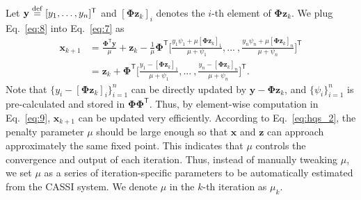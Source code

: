 \documentclass{article}
\newcommand{\tsp}{^{\mathsf{T}}}
\begin{document}
Let $\mathbf{y} \stackrel{\rm def}{=} [y_1,\dots,y_n]\tsp$ and $[\mathbf{\Phi} \mathbf{z}_k]_i$ denotes the $i$-th element of $\mathbf{\Phi}\mathbf{z}_k$. We plug Eq.~\eqref{eq:8} into Eq.~\eqref{eq:7} as
\begin{equation}
\begin{aligned}
	\mathbf{x}_{k+1} &= \frac{\mathbf{\Phi}\tsp \mathbf{y}}{\mu} + \mathbf{z}_{k} - \frac{1}{\mu} \mathbf{\Phi}\tsp \Big[\frac{y_1\psi_1+\mu [\mathbf{\Phi} \mathbf{z}_k]_1}{\mu+\psi_1}, ...~,\frac{y_n\psi_n+\mu [\mathbf{\Phi} \mathbf{z}_k]_n}{\mu+\psi_n}\Big]\tsp \\
	& = \mathbf{z}_{k} + \mathbf{\Phi}\tsp \Big[\frac{y_1 - [\mathbf{\Phi} \mathbf{z}_k]_1}{\mu+\psi_1}, ...~,\frac{y_n - [\mathbf{\Phi} \mathbf{z}_k]_n}{\mu+\psi_n}\Big]\tsp.
	\label{eq:9}
\end{aligned}
\end{equation}
Note that $\{y_i -[\mathbf{\Phi} \mathbf{z}_k]_i\}_{i=1}^n$ can be directly updated by $\mathbf{y} - \mathbf{\Phi} \mathbf{z}_k$, and $\{\psi_i\}_{i=1}^n$ is pre-calculated and stored in $\mathbf{\Phi} \mathbf{\Phi}\tsp$. Thus, by element-wise computation in Eq.~\eqref{eq:9}, $\mathbf{x}_{k+1}$ can be updated very efficiently.  According to Eq.~\eqref{eq:hqs_2}, the penalty parameter $\mu$ should be large enough so that $\mathbf{x}$ and $\mathbf{z}$ can approach approximately the same fixed point. This indicates that $\mu$ controls the convergence and output of each iteration.  Thus, instead of manually tweaking $\mu$, we set $\mu$ as a series of iteration-specific  parameters to be automatically estimated from the CASSI system. We denote $\mu$ in the $k$-th iteration as $\mu_k$. 
\end{document}
